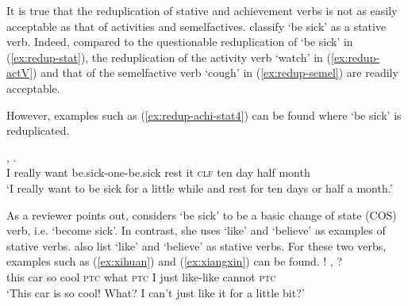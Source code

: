 It is true that  the reduplication of stative and achievement verbs is not as easily acceptable as that of activities and semelfactives.
\citet[155]{XiaoMcEnery2004} classify  `be sick' as a stative verb.
Indeed, compared  to the questionable reduplication of  `be sick' in (\ref{ex:redup-stat}),  
 the reduplication of the activity verb  `watch' in (\ref{ex:redup-actV})
and that of the semelfactive verb  `cough' in (\ref{ex:redup-semel}) are readily acceptable.

\settowidth{}

\ea
{}\label{ex:redup-stat}

\label{ex:redup-actV}

\label{ex:redup-semel}
\z
\z

However, examples such as (\ref{ex:redup-achi-stat4}) can be found where  `be sick' is reduplicated.

\ea\label{ex:redup-achi-stat4}
\gll {}   ,       .\\
I really want be.sick-one-be.sick rest it \textsc{clf} ten day half month\\ 
\glt `I really want to be sick for a little while and rest for ten days or half a month.'
\z

As a reviewer points out, \citet[Sec.\,3.3]{Tham2013} considers   `be sick' to be a basic change of state (COS) verb, i.e. `become sick'.
In contrast, she uses  `like' and  `believe' as examples of stative verbs.
\citet[680]{PeckEtAl2013} also list  `like' and  `believe' as stative verbs.
For these two verbs, examples such as (\ref{ex:xihuan}) and (\ref{ex:xiangxin}) can be found.
\ea\label{ex:xihuan}%
\gll {}    !  ,     ?\\
this car so cool \textsc{ptc} what \textsc{ptc} I just like-like cannot \textsc{ptc}\\
\glt `This car is so cool! What? I can't just like it for a little bit?'

